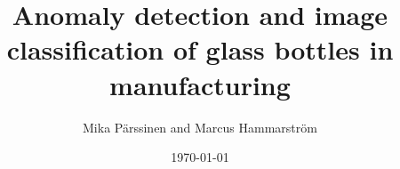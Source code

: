 \documentclass[a4paper]{article}
\title{Anomaly detection and image classification of glass bottles in manufacturing}
\author{Mika Pärssinen and Marcus Hammarström}
\date{\today}
\begin{document}
\maketitle









\renewcommand{\refname}{References}


\end{document}
